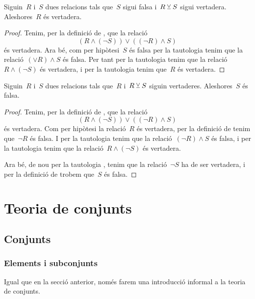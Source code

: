 \documentclass[../../main.tex]{subfiles}
\begin{document}
    \begin{tautology}
        \label{taut:disjunció excloent 1}
        Siguin~\(R\) i~\(S\) dues relacions tals que~\(S\) sigui falsa i~\(R\mathbin{\veebar} S\) sigui vertadera.
        Aleshores~\(R\) és vertadera.
    \end{tautology}
    \begin{proof}
        Tenim, per la definició de , que la relació
        \[
            (R\land(\lnot S))\lor((\lnot R)\land S)
        \]
        és vertadera.
        Ara bé, com per hipòtesi~\(S\) és falsa per la tautologia  tenim que la relació~\((\lor R)\land S\) és falsa.
        Per tant per la tautologia  tenim que la relació~\(R\land(\lnot S)\) és vertadera, i per la tautologia  tenim que~\(R\) és vertadera.
    \end{proof}
    \begin{tautology}
        \label{taut:disjunció excloent 2}
        Siguin~\(R\) i~\(S\) dues relacions tals que~\(R\) i~\(R\mathbin{\veebar} S\) siguin vertaderes.
        Aleshores~\(S\) és falsa.
    \end{tautology}
    \begin{proof}
        Tenim, per la definició de , que la relació
        \[
            (R\land(\lnot S))\lor((\lnot R)\land S)
        \]
        és vertadera.
        Com per hipòtesi la relació~\(R\) és vertadera, per la definició de  tenim que~\(\lnot R\) és falsa.
        I per la tautologia  tenim que la relació~\((\lnot R)\land S\) és falsa, i per la tautologia  tenim que la relació~\(R\land(\lnot S)\) és vertadera.

        Ara bé, de nou per la tautologia , tenim que la relació~\(\lnot S\) ha de ser vertadera, i per la definició de  trobem que~\(S\) és falsa.
    \end{proof}
\chapter{Teoria de conjunts}
\section{Conjunts}
    \subsection{Elements i subconjunts}
    Igual que en la secció anterior, només farem una introducció informal a la teoria de conjunts.
\end{document}
